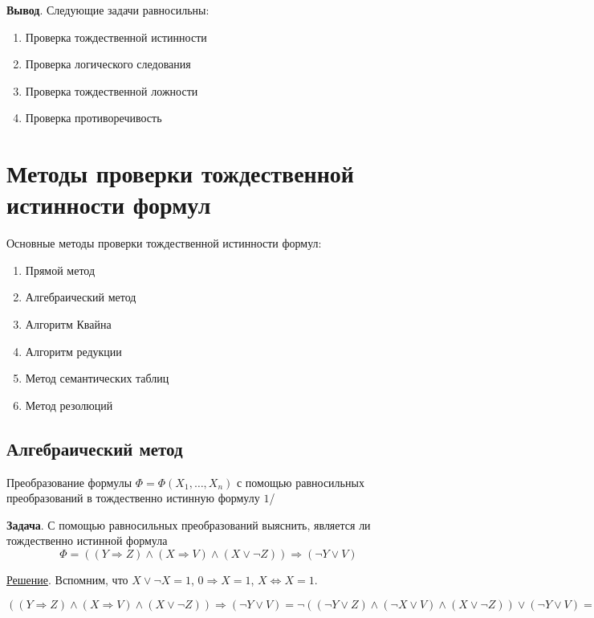 \textbf{Вывод}. Следующие задачи равносильны:
\begin{enumerate}
    \item Проверка тождественной истинности
    \item Проверка логического следования
    \item Проверка тождественной ложности
    \item Проверка противоречивость
\end{enumerate}

\section{Методы проверки тождественной истинности формул}

Основные методы проверки тождественной истинности формул:
\begin{enumerate}
    \item Прямой метод
    \item Алгебраический метод
    \item Алгоритм Квайна
    \item Алгоритм редукции
    \item Метод семантических таблиц
    \item Метод резолюций
\end{enumerate}

\subsection{Алгебраический метод}
Преобразование формулы $\Phi = \Phi(X_1, \dots, X_n)$ с помощью равносильных преобразований в тождественно истинную формулу $1$/

\textbf{Задача}. С помощью равносильных преобразований выяснить, является ли тождественно истинной формула $$\Phi = ((Y \Rightarrow Z) \land (X \Rightarrow V) \land (X \lor \lnot Z)) \Rightarrow (\lnot Y \lor 
V)$$

\underline{Решение}. Вспомним, что $X \lor \lnot X = 1$, $0 \Rightarrow X = 1$, $X \Leftrightarrow X = 1$.

$((Y \Rightarrow Z) \land (X \Rightarrow V) \land (X \lor \lnot Z)) \Rightarrow (\lnot Y \lor V) = \lnot((\lnot Y \lor Z) \land (\lnot X \lor V) \land (X \lor \lnot Z)) \lor (\lnot Y \lor V) = ((Y \land \lnot Z) \lor (X \land \lnot V) \lor (\lnot X \land Z)) \lor \lnot Y \lor V = ((Y \lor \lnot Z) \lor \lnot Y( \lor ((X \land \lnot V) \lor V) \lor (\lnot X \land Z) = ((Y \lor \lnot Y) \land (\lnot Z \lor \lnot Y)) \lor ((X \lor V) \land (\lnot V \lor V)) \lor (\lnot X \land Z) = \lnot Z \lor \lnot Y \lor V \lor (X \lor (\lnot X \land Z)) = \lnot Z \lor \lnot Y \lor V \lor ((X \lor \lnot X) \land (X \lor Z)) = \lnot Z \lor \lnot Y \lor V \lor X \lor Z = \ = (Z \lor \not Z) \lor \lnot Y \lor V \lor X = 1 \lor \lnot Y \lor V \lor X = 1$

